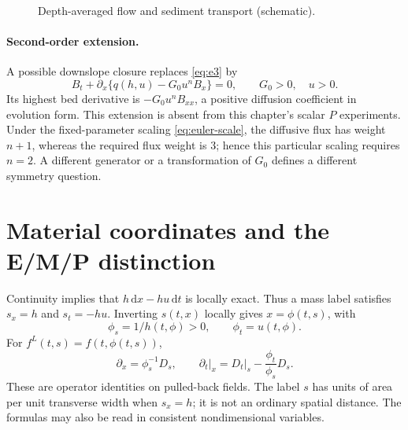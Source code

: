 \documentclass[11pt,a4paper,oneside]{report}
\numberwithin{equation}{chapter}
\newcommand{\dd}{\mathrm d}
\begin{document}
\begin{figure}[htbp]\centering
{}
\caption{Depth-averaged flow and sediment transport (schematic).}\label{fig:physical}
\end{figure}

\paragraph{Second-order extension.}
A possible downslope closure replaces \eqref{eq:e3} by
\begin{equation}\label{eq:diffusive}
B_t+\partial_x\{q(h,u)-G_0u^nB_x\}=0,\qquad G_0>0,\quad u>0.
\end{equation}
Its highest bed derivative is $-G_0u^nB_{xx}$, a positive diffusion coefficient in evolution form. This extension is absent from this chapter's scalar $P$ experiments. Under the fixed-parameter scaling \eqref{eq:euler-scale}, the diffusive flux has weight $n+1$, whereas the required flux weight is $3$; hence this particular scaling requires $n=2$. A different generator or a transformation of $G_0$ defines a different symmetry question.

\section{Material coordinates and the E/M/P distinction}
Continuity implies that $h\,\dd x-hu\,\dd t$ is locally exact. Thus a mass label satisfies $s_x=h$ and $s_t=-hu$. Inverting $s(t,x)$ locally gives $x=\phi(t,s)$, with
\begin{equation}
\phi_s=1/h(t,\phi)>0,\qquad \phi_t=u(t,\phi).
\end{equation}
For $f^L(t,s)=f(t,\phi(t,s))$,
\begin{equation}\label{eq:chain}
\partial_x=\phi_s^{-1}D_s,\qquad
\partial_t\big|_x=D_t\big|_s-\frac{\phi_t}{\phi_s}D_s.
\end{equation}
These are operator identities on pulled-back fields. The label $s$ has units of area per unit transverse width when $s_x=h$; it is not an ordinary spatial distance. The formulas may also be read in consistent nondimensional variables.
\end{document}
